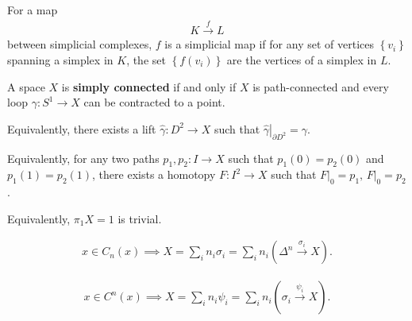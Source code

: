 \begin{definition}

For a map
\begin{align*}K\xrightarrow{f} L\end{align*}
between simplicial complexes, \(f\) is a simplicial map if for any set
of vertices \(\left\{{v_{i}}\right\}\) spanning a simplex in \(K\), the
set \(\left\{{f(v_{i})}\right\}\) are the vertices of a simplex in
\(L\).

\end{definition}

\begin{definition}

A space \(X\) is \textbf{simply connected} if and only if \(X\) is
path-connected and every loop \(\gamma : S^1 \xrightarrow{} X\) can be
contracted to a point.

Equivalently, there exists a lift
\(\widehat{\gamma }: D^2 \xrightarrow{} X\) such that
\({ \left.{{\widehat{\gamma}}} \right|_{{{{\partial}}D^2}} } = \gamma\).

Equivalently, for any two paths \(p_1, p_2: I \xrightarrow{} X\) such
that \(p_1(0) = p_2(0)\) and \(p_1(1) = p_2(1)\), there exists a
homotopy \(F: I^2 \xrightarrow{} X\) such that
\({ \left.{{F}} \right|_{{0}} } = p_1,\, { \left.{{F}} \right|_{{0}} } = p_2\).

Equivalently, \(\pi _1 X = 1\) is trivial.

\end{definition}

\begin{definition}

\begin{align*}x \in C_{n}(x) \implies X = \sum_{i} n_{i} \sigma_{i} = \sum_{i} n_{i} (\Delta^n \xrightarrow{\sigma_{i}} X)
.\end{align*}

\end{definition}

\begin{definition}

\begin{align*}x \in C^n(x) \implies X = \sum_{i} n_{i} \psi_{i} = \sum_{i} n_{i} (\sigma_{i} \xrightarrow{\psi_{i}} X)
.\end{align*}

\end{definition}

\begin{definition}

\end{definition}


